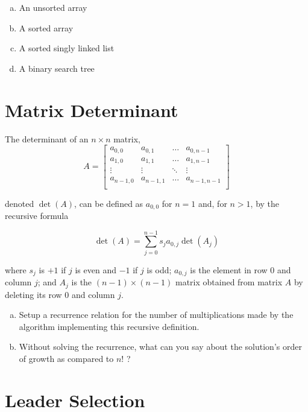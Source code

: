 \documentclass[12pt]{article}
\begin{document}
\begin{enumerate}[a.]
    \item An unsorted array
    \item A sorted array
    \item A sorted singly linked list
    \item A binary search tree
\end{enumerate}





\clearpage
\section{Matrix Determinant}

The determinant of an $n \times n$ matrix,
\[
A = \begin{bmatrix}
    a_{0,0} & a_{0,1} & \dots & a_{0,n-1} \\
    a_{1,0} & a_{1,1} & \dots & a_{1,n-1} \\
    \vdots  & \vdots  & \ddots & \vdots \\
    a_{n-1,0} & a_{n-1,1} & \dots & a_{n-1,n-1} \\
\end{bmatrix}
\]

denoted $\det(A)$, can be defined as $a_{0,0}$ for $n = 1$ and, for $n > 1$, by the recursive formula

\[
\det(A) = \sum_{j=0}^{n-1} s_j a_{0,j} \det(A_j)
\]

where $s_j$ is $+1$ if $j$ is even and $-1$ if $j$ is odd; $a_{0,j}$ is the element in row 0 and column $j$; and $A_j$ is the $(n-1) \times (n-1)$ matrix obtained from matrix $A$ by deleting its row 0 and column $j$.

\begin{enumerate}[a.]
    \item    Setup a recurrence relation for the number of multiplications made by the
algorithm implementing this recursive definition.
    \item Without solving the recurrence, what can you say about the solution's order
    of growth as compared to $n!$ ?
\end{enumerate}


\clearpage
\noindent
{}\vspace{-4.5em}
\section{ Leader Selection }
\end{document}

